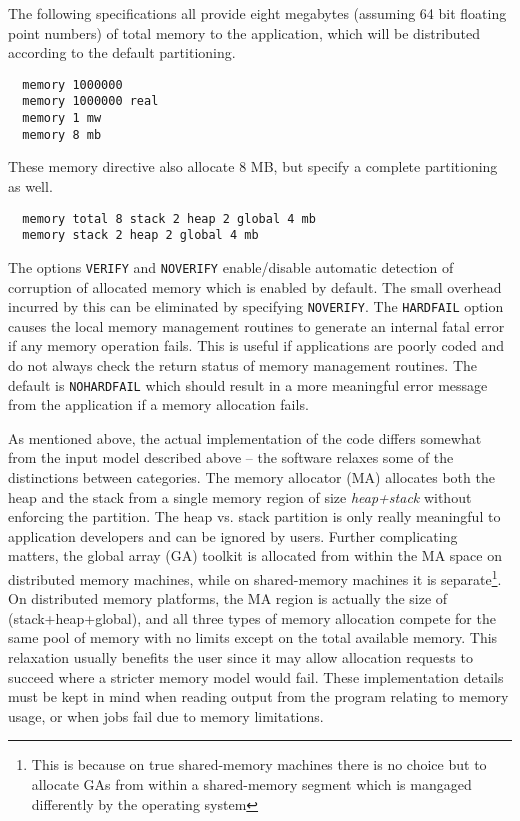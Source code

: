 The following specifications all provide eight megabytes (assuming 64
bit floating point numbers) of total memory to the application, which
will be distributed according to the default partitioning.
\begin{verbatim}
  memory 1000000
  memory 1000000 real
  memory 1 mw
  memory 8 mb
\end{verbatim}
These memory directive also allocate 8 MB, but specify a complete
partitioning as well.
\begin{verbatim}
  memory total 8 stack 2 heap 2 global 4 mb
  memory stack 2 heap 2 global 4 mb
\end{verbatim}
The options \verb+VERIFY+ and \verb+NOVERIFY+ enable/disable automatic
detection of corruption of allocated memory which is enabled by
default. The small overhead incurred by this can be eliminated by
specifying \verb+NOVERIFY+.  The \verb+HARDFAIL+ option causes the
local memory management routines to generate an internal fatal error
if any memory operation fails.  This is useful if applications are
poorly coded and do not always check the return status of memory
management routines.  The default is \verb+NOHARDFAIL+ which should
result in a more meaningful error message from the application if a
memory allocation fails.

As mentioned above, the actual implementation of the code differs
somewhat from the input model described above -- the software relaxes
some of the distinctions between categories.  The memory allocator
(MA) allocates both the heap and the stack from a single memory region
of size {\em heap+stack} without enforcing the partition.  The heap
vs. stack partition is only really meaningful to application
developers and can be ignored by users.  Further complicating matters,
the global array (GA) toolkit is allocated from within the MA space on
distributed memory machines, while on shared-memory machines it is
separate\footnote{This is because on true shared-memory machines there
  is no choice but to allocate GAs from within a shared-memory segment
  which is mangaged differently by the operating system}.  On
distributed memory platforms, the MA region is actually the size of
(stack+heap+global), and all three types of memory allocation compete
for the same pool of memory with no limits except on the total
available memory.  This relaxation usually benefits the user since it
may allow allocation requests to succeed where a stricter memory model
would fail.  These implementation details must be kept in mind when
reading output from the program relating to memory usage, or when jobs
fail due to memory limitations.

